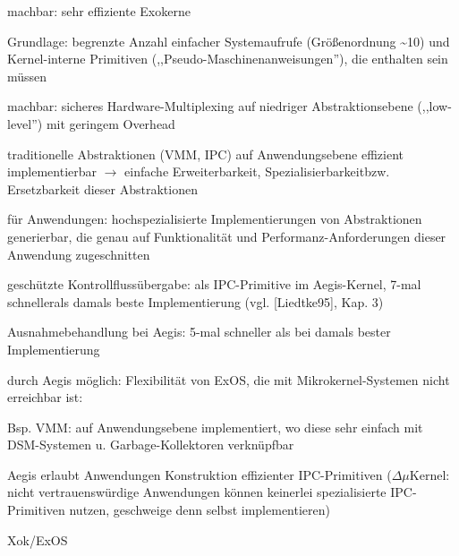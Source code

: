 \documentclass[a4paper]{article}
\begin{document}
\begin{multicols}{3}
    \begin{enumerate*}
        \item
        machbar: sehr effiziente Exokerne
        \begin{itemize*}
            \item Grundlage: begrenzte Anzahl einfacher Systemaufrufe (Größenordnung \textasciitilde10) und Kernel-interne Primitiven (,,Pseudo-Maschinenanweisungen''), die enthalten sein müssen
        \end{itemize*}
        \item
        machbar: sicheres Hardware-Multiplexing auf niedriger
        Abstraktionsebene (,,low-level'') mit geringem Overhead
        \item
        traditionelle Abstraktionen (VMM, IPC) auf Anwendungsebene effizient
        implementierbar $\rightarrow$ einfache
        Erweiterbarkeit, Spezialisierbarkeitbzw. Ersetzbarkeit dieser
        Abstraktionen
        \item
        für Anwendungen: hochspezialisierte Implementierungen von
        Abstraktionen generierbar, die genau auf Funktionalität und
        Performanz-Anforderungen dieser Anwendung zugeschnitten
        \item
        geschützte Kontrollflussübergabe: als IPC-Primitive im Aegis-Kernel,
        7-mal schnellerals damals beste Implementierung (vgl. {[}Liedtke95{]},
        Kap. 3)
        \item
        Ausnahmebehandlung bei Aegis: 5-mal schneller als bei damals bester
        Implementierung
        \item
        durch Aegis möglich: Flexibilität von ExOS, die mit
        Mikrokernel-Systemen nicht erreichbar ist:
        \begin{itemize*}
            \item Bsp. VMM: auf Anwendungsebene implementiert, wo diese sehr einfach mit DSM-Systemen u. Garbage-Kollektoren verknüpfbar
        \end{itemize*}
        \item
        Aegis erlaubt Anwendungen Konstruktion effizienter IPC-Primitiven ($\Delta \mu$Kernel: nicht vertrauenswürdige Anwendungen können keinerlei spezialisierte IPC-Primitiven nutzen, geschweige denn selbst implementieren)
    \end{enumerate*}

    Xok/ExOS


\end{multicols}
\end{document}
